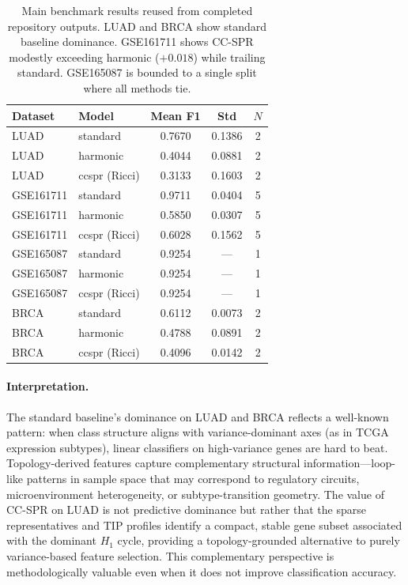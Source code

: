 \documentclass[11pt]{article}
\begin{document}
\begin{table}[h]
\centering
\small
\begin{tabular}{llccc}
\toprule
Dataset & Model & Mean F1 & Std & $N$ \\
\midrule
LUAD & standard & 0.7670 & 0.1386 & 2 \\
LUAD & harmonic & 0.4044 & 0.0881 & 2 \\
LUAD & ccspr (Ricci) & 0.3133 & 0.1603 & 2 \\
\midrule
GSE161711 & standard & 0.9711 & 0.0404 & 5 \\
GSE161711 & harmonic & 0.5850 & 0.0307 & 5 \\
GSE161711 & ccspr (Ricci) & 0.6028 & 0.1562 & 5 \\
\midrule
GSE165087 & standard & 0.9254 & --- & 1 \\
GSE165087 & harmonic & 0.9254 & --- & 1 \\
GSE165087 & ccspr (Ricci) & 0.9254 & --- & 1 \\
\midrule
BRCA & standard & 0.6112 & 0.0073 & 2 \\
BRCA & harmonic & 0.4788 & 0.0891 & 2 \\
BRCA & ccspr (Ricci) & 0.4096 & 0.0142 & 2 \\
\bottomrule
\end{tabular}
\caption{Main benchmark results reused from completed repository outputs.
LUAD and BRCA show standard baseline dominance.
GSE161711 shows CC-SPR modestly exceeding harmonic ($+0.018$) while trailing standard.
GSE165087 is bounded to a single split where all methods tie.}
\label{tab:mainbench}
\end{table}

\paragraph{Interpretation.}
The standard baseline's dominance on LUAD and BRCA reflects a well-known pattern: when class structure aligns with variance-dominant axes (as in TCGA expression subtypes), linear classifiers on high-variance genes are hard to beat.
Topology-derived features capture complementary structural information---loop-like patterns in sample space that may correspond to regulatory circuits, microenvironment heterogeneity, or subtype-transition geometry.
The value of CC-SPR on LUAD is not predictive dominance but rather that the sparse representatives and TIP profiles identify a compact, stable gene subset associated with the dominant $H_1$ cycle, providing a topology-grounded alternative to purely variance-based feature selection.
This complementary perspective is methodologically valuable even when it does not improve classification accuracy.
\end{document}
